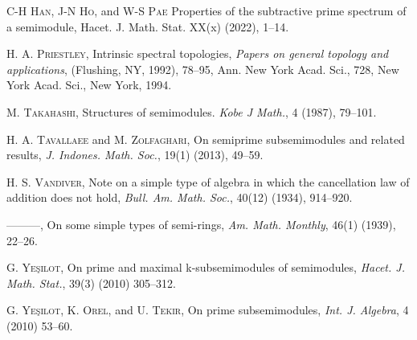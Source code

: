 \documentclass[12pt,english]{smfart}
\theoremstyle{definition}
\begin{document}
\begin{thebibliography}{1}
\textsc{C-H Han}, \textsc{J-N Ho}, and \textsc{W-S Pae}
Properties of the subtractive prime spectrum of a
semimodule, Hacet. J. Math. Stat.
XX(x) (2022), 1--14.

 \textsc{H. A. Priestley}, Intrinsic spectral topologies, \emph{Papers on general topology and applications},
(Flushing, NY, 1992), 78--95, Ann. New York Acad. Sci., 728, New York Acad. Sci., New York, 1994.

\textsc{M. Takahashi}, Structures of semimodules. \textit{Kobe J Math.}, 4 (1987), 79--101.
 
\textsc{H. A. Tavallaee} and \textsc{M. Zolfaghari}, On semiprime subsemimodules and related results, \textit{J. Indones. Math. Soc.},
19(1) (2013), 49--59.

\textsc{H. S. Vandiver}, Note on a simple type of algebra in which the cancellation law
of addition does not hold, \textit{Bull. Am. Math. Soc.}, 40(12) (1934), 914--920.

---------, On some simple types of semi-rings, \textit{Am. Math. Monthly}, 46(1) (1939), 22--26.

\textsc{G. Ye\c silot}, On prime and maximal k-subsemimodules of semimodules, \textit{Hacet. J. Math.
Stat.}, 39(3) (2010) 305--312.

\textsc{G. Ye\c silot}, \textsc{K. Orel}, and \textsc{U. Tekir}, On prime subsemimodules, \textit{Int. J. Algebra}, 4 (2010) 53--60.
\end{thebibliography}
\end{document}
